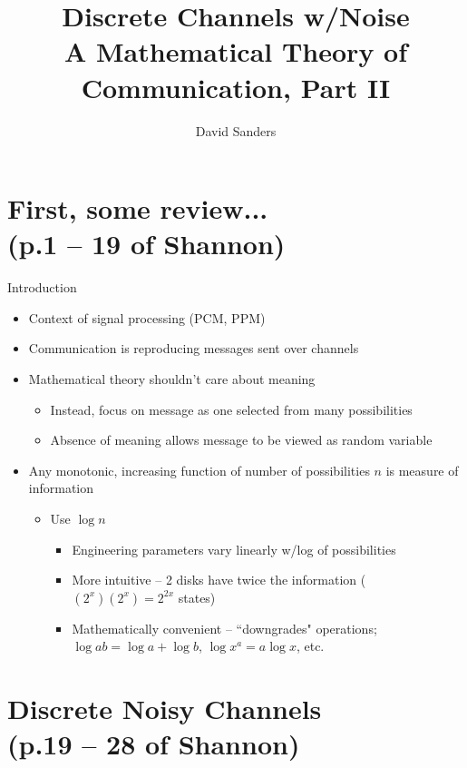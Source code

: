 \documentclass{beamer}
\title{%
  Discrete Channels w/Noise \\
  \normalsize A Mathematical Theory of Communication, Part II}
\author{David Sanders}
\begin{document}
  \maketitle

  \section{First, some review... \\
           \small (p.1 -- 19 of Shannon)}

  \begin{frame}{Introduction}
    \begin{itemize}
      \item Context of signal processing (PCM, PPM)
      \item Communication is reproducing messages sent over channels
      \item Mathematical theory shouldn't care about meaning
      \begin{itemize}
        \item Instead, focus on message as one selected from many possibilities
        \item Absence of meaning allows message to be viewed as random variable
      \end{itemize}
      \item Any monotonic, increasing function of number of possibilities $n$
      is measure of information
      \begin{itemize}
        \item Use $\log n$
        \begin{itemize}
          \item Engineering parameters vary linearly w/log of possibilities
          \item More intuitive -- 2 disks have twice the information ($(2^x)(2^x) = 2^{2x}$ states)
          \item Mathematically convenient -- ``downgrades" operations; $\log ab
          = \log a + \log b$, $\log x^a = a \log x$, etc.
        \end{itemize}
      \end{itemize}
    \end{itemize}
  \end{frame}

  \section{Discrete Noisy Channels \\
           \small (p.19 -- 28 of Shannon)}
\end{document}
